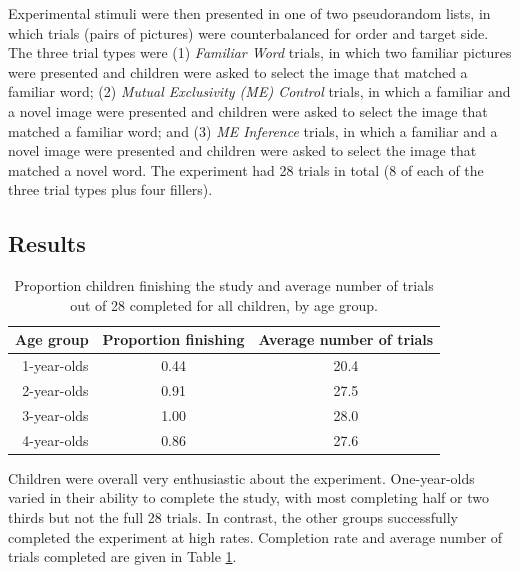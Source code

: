 \documentclass[man,noapacite]{apa2}
\begin{document}
Experimental stimuli were then presented in one of two pseudorandom lists, in which trials (pairs of pictures) were counterbalanced for order and target side. The three trial types were (1) \emph{Familiar Word} trials, in which two familiar pictures were presented and children were asked to select the image that matched a familiar word; (2) \emph{Mutual Exclusivity (ME) Control} trials, in which a familiar and a novel image were presented and children were asked to select the image that matched a familiar word; and (3) \emph{ME Inference} trials, in which a familiar and a novel image were presented and children were asked to select the image that matched a novel word. The experiment had 28 trials in total (8 of each of the three trial types plus four fillers). 

\subsection{Results}


\begin{table}[t]
\centering
\caption{Proportion children finishing the study and average number of trials out of 28 completed for all children, by age group.\label{tab:completion}}

\begin{tabular}{rcc}
  \hline
Age group & Proportion finishing & Average number of trials \\ 
  \hline
1-year-olds & 0.44 & 20.4 \\ 
2-year-olds & 0.91 & 27.5 \\ 
3-year-olds & 1.00 & 28.0 \\ 
4-year-olds & 0.86 & 27.6 \\ 
   \hline
\end{tabular}
\end{table}

Children were overall very enthusiastic about the experiment. One-year-olds varied in their ability to complete the study, with most completing half or two thirds but not the full 28 trials. In contrast, the other groups successfully completed the experiment at high rates. Completion rate and average number of trials completed are given in Table \ref{tab:completion}.
\end{document}

